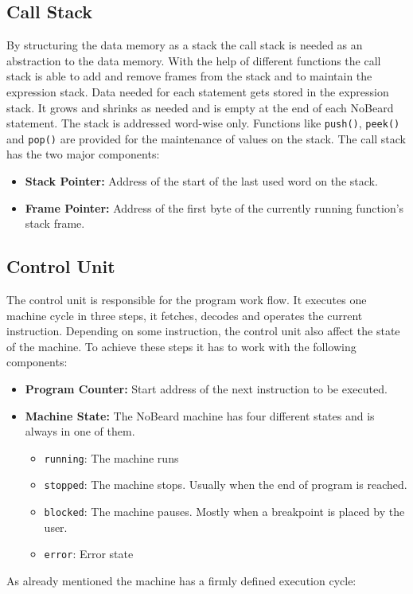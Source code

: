 \subsection{Call Stack}
By structuring the data memory as a stack the call stack is needed as an abstraction to the data memory. With the help of different functions the call stack is able to add and remove frames from the stack and to maintain the expression stack. Data needed for each statement gets stored in the expression stack. It grows and shrinks as needed and is empty at the end of each NoBeard statement. The stack is addressed word-wise only. Functions like \lstinline$push()$, \lstinline$peek()$ and \lstinline$pop()$ are provided for the maintenance of values on the stack. The call stack has the two major components:

\begin{itemize}
\item \textbf{Stack Pointer: }Address of the start of the last used word on the stack. 
\item \textbf{Frame Pointer: }Address of the first byte of the currently running function's stack frame. 
\end{itemize}

\subsection{Control Unit}
The control unit is responsible for the program work flow. It executes one machine cycle in three steps, it fetches, decodes and operates the current instruction. Depending on some instruction, the control unit also affect the state of the machine. To achieve these steps it has to work with the following components:

\begin{itemize}
\item \textbf{Program Counter: }Start address of the next instruction to be executed.
\item \textbf{Machine State: }The NoBeard machine has four different states and is always in one of them. 
	\begin{itemize}
		\item \lstinline$running$: The machine runs
		\item \lstinline$stopped$: The machine stops. Usually when the end of program is reached.
		\item \lstinline$blocked$: The machine pauses. Mostly when a breakpoint is placed by the user.
		\item \lstinline$error$: Error state
	\end{itemize}
\end{itemize}
As already mentioned the machine has a firmly defined execution cycle:

